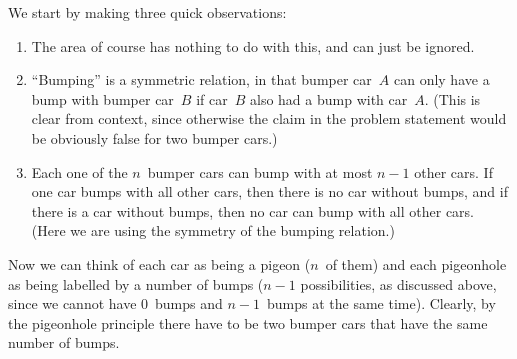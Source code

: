 \documentclass{jn-pset}
\begin{document}
\begin{solution}
  We start by making three quick observations:
  \begin{enumerate}
    \item
      The area of course has nothing to do with this, and can just be ignored.

    \item
      ``Bumping'' is a symmetric relation, in that bumper car~$A$
      can only have a bump with bumper car~$B$ if car~$B$ also had a
      bump with car~$A$. (This is clear from context, since otherwise
      the claim in the problem statement would be obviously false for
      two bumper cars.) 

    \item
      Each one of the $n$~bumper cars can bump with at most $n-1$
      other cars. If one car bumps with all other cars, then there is
      no car without bumps, and if there is a car without bumps, then
      no car can bump with all other cars.
      (Here we are using the symmetry of the bumping relation.)

  \end{enumerate}
%
  Now we can think of each car as being a pigeon
  ($n$~of them) and each pigeonhole as being labelled by a number of
  bumps ($n-1$ possibilities, as discussed above, since
  we cannot have $0$~bumps and $n-1$~bumps at the same time).
  Clearly, by the pigeonhole principle there have to be two bumper cars
  that have the same number   of bumps.
\end{solution}
\end{document}
